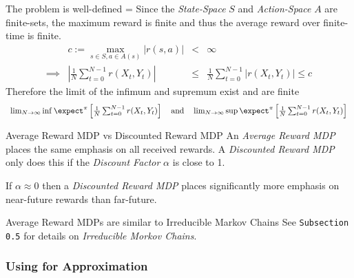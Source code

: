 \documentclass[11pt,a4paper]{article}
\begin{document}
  \begin{remark}{The problem is well-defined}
    \everymath={\displaystyle}
    Since the \textit{State-Space} $S$ and \textit{Action-Space} $A$ are finite-sets, the maximum reward is finite and thus the average reward over finite-time is finite.
    \[\begin{array}{rrcl}
      &c:=\max_{s\in S,a\in A(s)}|r(s,a)|&<&\infty\\
      \implies&\left|\frac1N\sum_{t=0}^{N-1}r(X_t,Y_t)\right|&\leq&\frac1N\sum_{t=0}^{N-1}|r(X_t,Y_t)|\leq c
    \end{array}\]
    Therefore the limit of the infimum and supremum exist and are finite
    \[\begin{array}{rcl}
      \lim_{N\to\infty}\inf\expect^\pi\left[\frac1N\sum_{t=0}^{N-1}r(X_t,Y_t)\right]\quad\text{and}\quad\lim_{N\to\infty}\sup\expect^\pi\left[\frac1N\sum_{t=0}^{N-1}r(X_t,Y_t)\right]
    \end{array}\]
  \end{remark}

  \begin{remark}{Average Reward MDP vs Discounted Reward MDP}
    An \textit{Average Reward MDP} places the same emphasis on all received rewards. A \textit{Discounted Reward MDP} only does this if the \textit{Discount Factor} $\alpha$ is close to 1.
    \par If $\alpha\approx0$ then a \textit{Discounted Reward MDP} places significantly more emphasis on near-future rewards than far-future.
  \end{remark}

  \begin{remark}{Average Reward MDPs are similar to Irreducible Markov Chains}
    See \texttt{Subsection 0.5}  for details on \textit{Irreducible Morkov Chains}.
  \end{remark}

\subsubsection{Using for Approximation}
\end{document}
